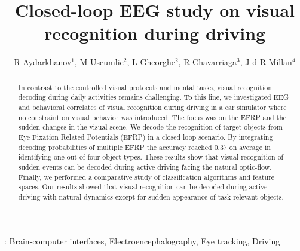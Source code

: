 \documentclass[12pt]{iopart}
\begin{document}
\title[]{Closed-loop EEG study on visual recognition during driving}

\author{R Aydarkhanov$^1$,
M Uscumlic$^2$,
L Gheorghe$^2$,
R Chavarriaga$^3$,
J d R Millan$^4$}


\address{$^1$EPFL, Switzerland}
\address{$^2$EPFL, Switzerland}
\address{$^3$EPFL, Switzerland}
\address{$^4$TU Austin, USA}
\vspace{10pt}

\begin{abstract}
In contrast to the controlled visual protocols and mental tasks,
visual recognition decoding during daily activities remains challenging.
To this line, we investigated EEG and behavioral correlates of
visual recognition during driving in a car simulator where 
no constraint on visual behavior was introduced. 
The focus was on the EFRP and the sudden changes in the visual scene. 
We decode the recognition of target objects from 
Eye Fixation Related Potentials (EFRP) in a closed loop scenario. 
By integrating decoding probabilities of multiple 
EFRP the accuracy reached 0.37 on average in identifying 
one out of four object types. 
These results show that visual recognition of sudden events
can be decoded during active driving facing the  natural optic-flow. 
Finally, we performed a comparative study of 
classification algorithms and feature spaces. Our results showed that
visual recognition can be decoded during
active driving with natural dynamics except for sudden appearance
of task-relevant objects.
    
\end{abstract}

%
\vspace{2pc}
: Brain-computer interfaces, Electroencephalography, Eye tracking, Driving
%
%
% 
%



\end{document}
